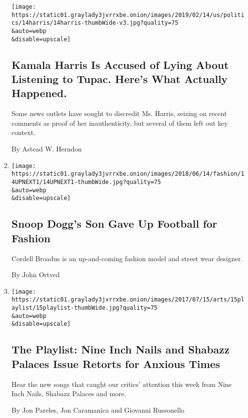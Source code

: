 \begin{enumerate}
  \texttt{[image: https://static01.graylady3jvrrxbe.onion/images/2019/02/14/us/politics/14harris/14harris-thumbWide-v3.jpg?quality=75\\\&auto=webp\\\&disable=upscale]}

  \hypertarget{kamala-harris-is-accused-of-lying-about-listening-to-tupac-heres-what-actually-happened}{%
  \subsection{Kamala Harris Is Accused of Lying About Listening to
  Tupac. Here's What Actually
  Happened.}\label{kamala-harris-is-accused-of-lying-about-listening-to-tupac-heres-what-actually-happened}}

  Some news outlets have sought to discredit Ms. Harris, seizing on
  recent comments as proof of her inauthenticity, but several of them
  left out key context.

  By Astead W. Herndon
\item
  \href{/2018/06/13/fashion/cordell-broadus-fashion-line-snoop-dogg.html}{}

  \texttt{[image: https://static01.graylady3jvrrxbe.onion/images/2018/06/14/fashion/14UPNEXT1/14UPNEXT1-thumbWide.jpg?quality=75\\\&auto=webp\\\&disable=upscale]}

  \hypertarget{snoop-doggs-son-gave-up-football-for-fashion}{%
  \subsection{Snoop Dogg's Son Gave Up Football for
  Fashion}\label{snoop-doggs-son-gave-up-football-for-fashion}}

  Cordell Broadus is an up-and-coming fashion model and street wear
  designer.

  By John Ortved
\item
  \href{/2017/07/14/arts/music/playlist-nine-inch-nails-shabazz-palaces-waxahatchee.html}{}

  \texttt{[image: https://static01.graylady3jvrrxbe.onion/images/2017/07/15/arts/15playlist/15playlist-thumbWide.jpg?quality=75\\\&auto=webp\\\&disable=upscale]}

  \hypertarget{the-playlist-nine-inch-nails-and-shabazz-palaces-issue-retorts-for-anxious-times}{%
  \subsection{The Playlist: Nine Inch Nails and Shabazz Palaces Issue
  Retorts for Anxious
  Times}\label{the-playlist-nine-inch-nails-and-shabazz-palaces-issue-retorts-for-anxious-times}}

  Hear the new songs that caught our critics' attention this week from
  Nine Inch Nails, Shabazz Palaces and more.

  By Jon Pareles, Jon Caramanica and Giovanni Russonello
\end{enumerate}

